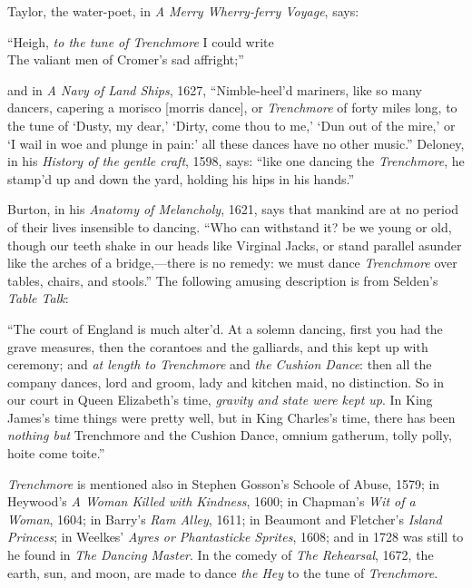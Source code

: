 Taylor, the water-poet, in \textit{A Merry Wherry-ferry Voyage}, says:
\begin{scverse}
“Heigh, \textit{to the tune of Trenchmore} I could write\\
The valiant men of Cromer’s sad affright;”
\end{scverse}
\noindent and in \textit{A Navy of Land Ships}, 1627, “Nimble-heel’d mariners, like so many
dancers, capering a morisco [morris dance], or \textit{Trenchmore} of forty miles long,
to the tune of ‘Dusty, my dear,’ ‘Dirty, come thou to me,’ ‘Dun out of the mire,’
or ‘I wail in woe and plunge in pain:’ all these dances have no other music.”
Deloney, in his \textit{History of the gentle craft}, 1598, says: “like one dancing the
\textit{Trenchmore}, he stamp’d up and down the yard, holding his hips in his hands.”

Burton, in his \textit{Anatomy of Melancholy}, 1621, says that mankind are at no
period of their lives insensible to dancing. “Who can withstand it? be we young
or old, though our teeth shake in our heads like Virginal Jacks, or stand parallel
asunder like the arches of a bridge,—there is no remedy: we must dance \textit{Trenchmore}
over tables, chairs, and stools.” The following amusing description is from
Selden’s \textit{Table Talk}:

“The court of England is much alter’d. At a solemn dancing, first you had the
grave measures, then the corantoes and the galliards, and this kept up with ceremony; 
and \textit{at length to Trenchmore} and \pagebreak \textit{the Cushion Dance}: then all the company dances, 
lord and groom, lady and kitchen maid, no distinction. So in our court in Queen
Elizabeth’s time, \textit{gravity and state were kept up}. In King James’s time things were
pretty well, but in King Charles’s time, there has been \textit{nothing but} Trenchmore and
the Cushion Dance, omnium gatherum, tolly polly, hoite come toite.”



\textit{Trenchmore} is mentioned also in Stephen Gosson’s Schoole of Abuse, 1579; in
Heywood’s \textit{A Woman Killed with Kindness}, 1600; in Chapman’s \textit{Wit of a
Woman}, 1604; in Barry’s \textit{Ram Alley}, 1611; in Beaumont and Fletcher’s \textit{Island
Princess}; in Weelkes’ \textit{Ayres or Phantasticke Sprites}, 1608; and in 1728 was
still to he found in \textit{The Dancing Master}. In the comedy of \textit{The Rehearsal},
1672, the earth, sun, and moon, are made to dance \textit{the Hey} to the tune of
\textit{Trenchmore}.

